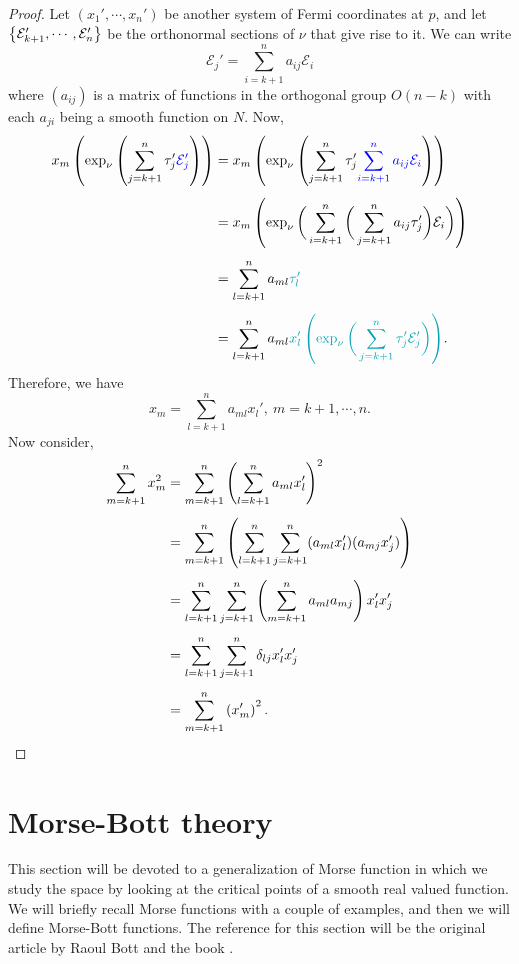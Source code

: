 \begin{proof}
    Let $(x_1',\cdots,x_n')$ be another system of Fermi coordinates at $p$, and let $\left\{ \mathcal{E}_{k+1}', \cdots, \mathcal{E}_n' \right\}$ be the orthonormal sections of $\nu$ that give rise to it. We can write
    \begin{displaymath}
        \mathcal{E}_j' = \sum_{i=k+1}^na_{ij}\mathcal{E}_i
    \end{displaymath}
    where $(a_{ij})$ is a matrix of functions in the orthogonal group $O(n-k)$ with each $a_{ji}$ being a smooth function on $N.$ Now,
    \begin{align*}
        x_m\paran{\exp_\nu\paran{\sum_{j=k+1}^n \tau_j'\textcolor{blue}{\mathcal{E}_j'}}} & = x_m \paran{\exp_\nu\paran{ \sum_{j=k+1}^n\tau_j' \textcolor{blue}{\sum_{i=k+1}^na_{ij}\mathcal{E}_i}}} 
        \\[1ex]
        & = x_m\paran{\exp_\nu \bigg(\sum_{i=k+1}^n \bigg(\sum_{j=k+1}^na_{ij}\tau_j'\bigg) \mathcal{E}_i\bigg)}
        \\[1ex]
        & = \sum_{l=k+1}^n a_{ml}\textcolor[HTML]{06a3b3}{\tau_l'} 
        \\[1ex]
        & = \sum_{l=k+1}^n a_{ml}\textcolor[HTML]{06a3b3}{x_l' \left(\exp_\nu \bigg(\sum_{j=k+1}^n\tau_j'\mathcal{E}_j'\bigg)\right)}.
    \end{align*}
    Therefore, we have 
    \begin{equation}
        x_m = \sum_{l=k+1}^na_{ml}x_l',~m=k+1,\cdots,n.
    \end{equation}
    Now consider,
    \begin{align*}
        \sum_{m=k+1}^n x_m^2 & = \sum_{m=k+1}^n\left( \sum_{l=k+1}^na_{ml}x_l' \right)^2 
        \\[1ex]
        & = \sum_{m=k+1}^n\left( \sum_{l=k+1}^n\sum_{j=k+1}^n (a_{ml}x_l') (a_{mj}x_j') \right) 
        \\[1ex]
        & = \sum_{l=k+1}^n\sum_{j=k+1}^n \left(\sum_{m=k+1}^na_{ml}a_{mj}\right)x_l'x_j'\\[1ex]
        & = \sum_{l=k+1}^n\sum_{j=k+1}^n\delta_{lj}x_l'x_j' \\[1ex]
        & = \sum_{m=k+1}^n \left(x_m'\right)^2.
    \end{align*}
\end{proof}

\section{Morse-Bott theory} \label{Sec:MorseBottFunctions}
\hfb This section will be devoted to a generalization of Morse function in which we study the space by looking at the critical points of a smooth real valued function. We will briefly recall Morse functions with a couple of examples, and then we will define Morse-Bott functions. The reference for this section will be the original article by Raoul Bott \cite{Bot54} and the book \cite[Section 3.5]{BaHu04}.

